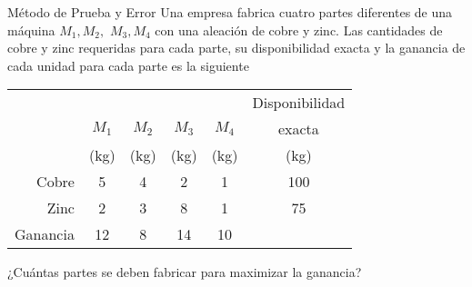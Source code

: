 \begin{frameExample}{Método de Prueba y Error}{}
  Una empresa fabrica cuatro partes diferentes de una máquina $M_1, M_2,$ $ M_3, M_4$ con una aleación de cobre y zinc. Las cantidades de cobre y zinc requeridas para cada parte, su \alert{disponibilidad exacta} y la ganancia de cada unidad para cada parte es la siguiente

  {\centering
    \begin{tabular}{rccccc}
      \toprule
      &&&&&Disponibilidad\\
      &$M_1$&$M_2$&$M_3$&$M_4$&exacta\\
      &(kg)&(kg)&(kg)&(kg)&(kg)\\
      \midrule
      Cobre&5&4&2&1&100\\
      Zinc&2&3&8&1&75\\
      Ganancia&12&8&14&10&\\
      \bottomrule
    \end{tabular}
  \par}

¿Cuántas partes se deben fabricar para maximizar la ganancia?
\end{frameExample}

